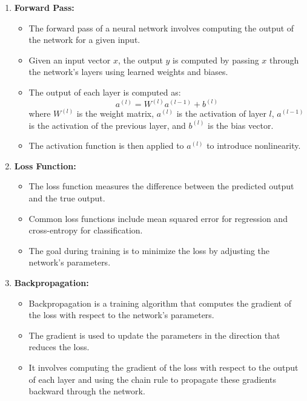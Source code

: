 \documentclass{article}
\begin{document}
\begin{enumerate}
    \item \textbf{Forward Pass:}
        \begin{itemize}
            \item The forward pass of a neural network involves computing the output of the network for a given input.
            \item Given an input vector \(x\), the output \(y\) is computed by passing \(x\) through the network's layers using learned weights and biases.
            \item The output of each layer is computed as:
            \[
            a^{(l)} = W^{(l)}a^{(l-1)} + b^{(l)}
            \]
            where \(W^{(l)}\) is the weight matrix, \(a^{(l)}\) is the activation of layer \(l\), \(a^{(l-1)}\) is the activation of the previous layer, and \(b^{(l)}\) is the bias vector.
            \item The activation function is then applied to \(a^{(l)}\) to introduce nonlinearity.
        \end{itemize}
    
    \item \textbf{Loss Function:}
        \begin{itemize}
            \item The loss function measures the difference between the predicted output and the true output.
            \item Common loss functions include mean squared error for regression and cross-entropy for classification.
            \item The goal during training is to minimize the loss by adjusting the network's parameters.
        \end{itemize}
    
    \item \textbf{Backpropagation:}
        \begin{itemize}
            \item Backpropagation is a training algorithm that computes the gradient of the loss with respect to the network's parameters.
            \item The gradient is used to update the parameters in the direction that reduces the loss.
            \item It involves computing the gradient of the loss with respect to the output of each layer and using the chain rule to propagate these gradients backward through the network.
        \end{itemize}
\end{enumerate}
\end{document}
